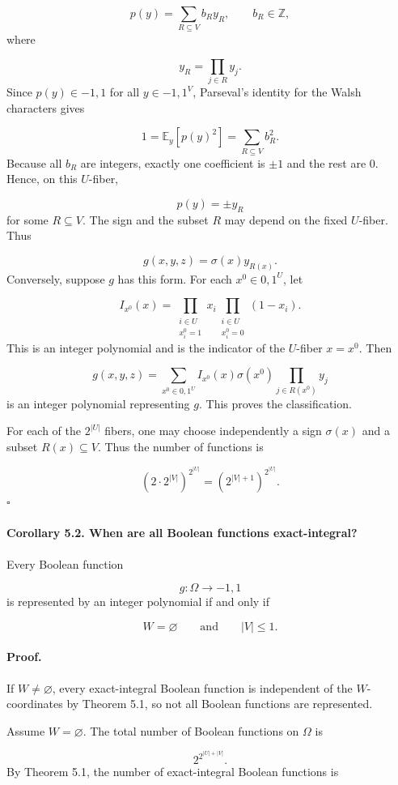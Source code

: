 \documentclass[11pt]{article}
\theoremstyle{definition}
\begin{document}
\[
p(y)=\sum_{R\subseteq V} b_R y_R,
\qquad b_R\in\mathbb{Z},
\]
where

\[
y_R=\prod_{j\in R}y_j.
\]
Since $p(y)\in{-1,1}$ for all $y\in{-1,1}^{V}$, Parseval's identity for the Walsh characters gives

\[
1=\mathbb{E}_y[p(y)^2]=\sum_{R\subseteq V}b_R^2.
\]
Because all $b_R$ are integers, exactly one coefficient is $\pm1$ and the rest are $0$. Hence, on this $U$-fiber,

\[
p(y)=\pm y_R
\]
for some $R\subseteq V$. The sign and the subset $R$ may depend on the fixed $U$-fiber. Thus

\[
g(x,y,z)=\sigma(x)y_{R(x)}.
\]
Conversely, suppose $g$ has this form. For each $x^0\in{0,1}^{U}$, let

\[
I_{x^0}(x)
=
\prod_{\substack{i\in U\\ x_i^0=1}}x_i
\prod_{\substack{i\in U\\ x_i^0=0}}(1-x_i).
\]
This is an integer polynomial and is the indicator of the $U$-fiber $x=x^0$. Then

\[
g(x,y,z)
=
\sum_{x^0\in{0,1}^{U}}
I_{x^0}(x)
\sigma(x^0)
\prod_{j\in R(x^0)}y_j
\]
is an integer polynomial representing $g$. This proves the classification.

For each of the $2^{|U|}$ fibers, one may choose independently a sign $\sigma(x)$ and a subset $R(x)\subseteq V$. Thus the number of functions is

\[
(2\cdot 2^{|V|})^{2^{|U|}}
=
\left(2^{|V|+1}\right)^{2^{|U|}}.
\]
\(\square\)
\paragraph{Corollary 5.2. When are all Boolean functions exact-integral?}
Every Boolean function

\[
g:\Omega\to{-1,1}
\]
is represented by an integer polynomial if and only if

\[
W=\varnothing
\qquad\text{and}\qquad
|V|\le1.
\]
\paragraph{Proof.}
If $W\ne\varnothing$, every exact-integral Boolean function is independent of the $W$-coordinates by Theorem 5.1, so not all Boolean functions are represented.

Assume $W=\varnothing$. The total number of Boolean functions on $\Omega$ is

\[
2^{2^{|U|+|V|}}.
\]
By Theorem 5.1, the number of exact-integral Boolean functions is
\end{document}
